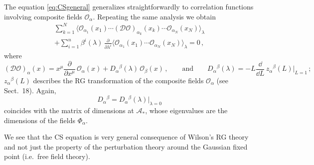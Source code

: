 The equation \eqref{eq:CSgeneral} generalizes straightforwardly to correlation
functions involving composite fields $\mathcal O_\alpha$. Repeating the same
analysis we obtain
\begin{multline}\label{eq:CScomposite}
\sum_{k=1}^N\bigl\langle\mathcal O_{\alpha_1}(x_1)\cdots(\mathcal D\mathcal O)_{\alpha_k}(x_k)\cdots\mathcal O_{\alpha_N}(x_N)\bigr\rangle_\lambda\\
+\sum_{i=1}^n\beta^i(\lambda)\,\frac\partial{\partial\lambda^i}\bigl\langle\mathcal O_{\alpha_1}(x_1)\cdots\mathcal O_{\alpha_N}(x_N)\bigr\rangle_\lambda=0\,,
\end{multline}
where
\[
(\mathcal D\mathcal O)_\alpha(x)=x^\mu\frac\partial{\partial x^\mu}\,\mathcal O_\alpha(x)+D_\alpha{}^\beta(\lambda)\,\mathcal O_\beta(x)\,,
\qquad\text{and}\qquad
D_\alpha{}^\beta(\lambda)=-L\frac{\dd}{\dd L}\,z_\alpha{}^\beta(L)\Big|_{L=1}\,;
\]
$z_\alpha{}^\beta(L)$ describes the RG transformation of the composite fields
$\mathcal O_\alpha$ (see Sect.~18). Again,
\[
D_\alpha{}^\beta=D_\alpha{}^\beta(\lambda)\big|_{\lambda=0}
\]
coincides with the matrix of dimensions at $\mathcal A_*$, whose eigenvalues are
the dimensions of the fields $\Phi_\alpha$.

We see that the CS equation is very general consequence of Wilson's RG theory and
not just the property of the perturbation theory around the Gaussian fixed point
(i.e.\ free field theory).
